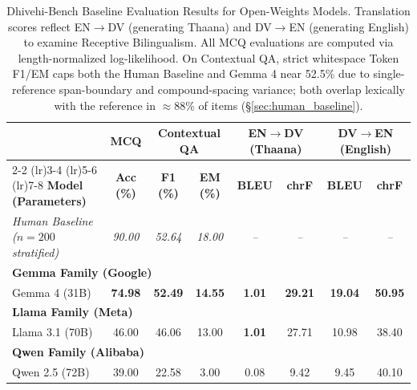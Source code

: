 \documentclass[acmsmall,review,anonymous]{acmart}
\begin{document}
\begin{table}[t]
\centering
\small
\setlength{\tabcolsep}{4.5pt}
\caption{Dhivehi-Bench Baseline Evaluation Results for Open-Weights Models. Translation scores reflect EN$\rightarrow$DV (generating Thaana) and DV$\rightarrow$EN (generating English) to examine Receptive Bilingualism. All MCQ evaluations are computed via length-normalized log-likelihood. On Contextual QA, strict whitespace Token F1/EM caps both the Human Baseline and Gemma 4 near 52.5\% due to single-reference span-boundary and compound-spacing variance; both overlap lexically with the reference in $\approx$88\% of items (\S\ref{sec:human_baseline}).}
\label{tab:results}
\begin{tabular}{l c cc cc cc}
\toprule
& \textbf{MCQ} & \multicolumn{2}{c}{\textbf{Contextual QA}} & \multicolumn{2}{c}{\textbf{EN$\rightarrow$DV (Thaana)}} & \multicolumn{2}{c}{\textbf{DV$\rightarrow$EN (English)}} \\
\cmidrule(lr){2-2} \cmidrule(lr){3-4} \cmidrule(lr){5-6} \cmidrule(lr){7-8}
\textbf{Model (Parameters)} & \textbf{Acc (\%)} & \textbf{F1 (\%)} & \textbf{EM (\%)} & \textbf{BLEU} & \textbf{chrF} & \textbf{BLEU} & \textbf{chrF} \\
\midrule
\textit{Human Baseline ($n=200$ stratified)} & \textit{90.00} & \textit{52.64} & \textit{18.00} & \textit{--} & \textit{--} & \textit{--} & \textit{--} \\
\midrule
\multicolumn{8}{l}{\textbf{Gemma Family (Google)}} \\
\quad Gemma 4 (31B) & \textbf{74.98} & \textbf{52.49} & \textbf{14.55} & \textbf{1.01} & \textbf{29.21} & \textbf{19.04} & \textbf{50.95} \\
\midrule
\multicolumn{8}{l}{\textbf{Llama Family (Meta)}} \\
\quad Llama 3.1 (70B) & 46.00 & 46.06 & 13.00 & \textbf{1.01} & 27.71 & 10.98 & 38.40 \\
\midrule
\multicolumn{8}{l}{\textbf{Qwen Family (Alibaba)}} \\
\quad Qwen 2.5 (72B) & 39.00 & 22.58 & 3.00 & 0.08 & 9.42 & 9.45 & 40.10 \\
\bottomrule
\end{tabular}
\end{table}
\end{document}
